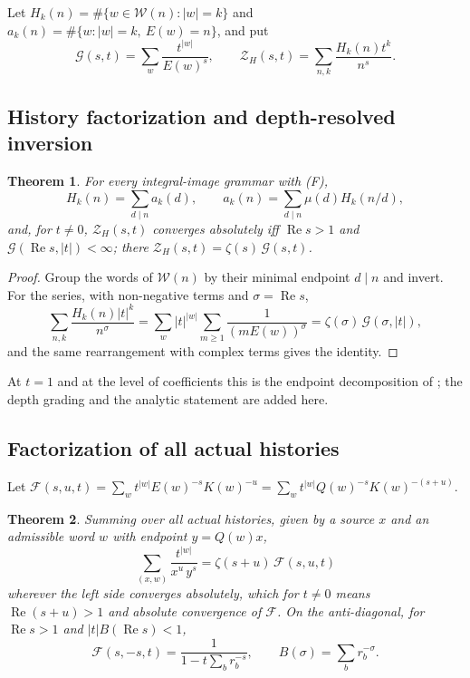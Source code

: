 \documentclass[11pt,a4paper]{article}
\newtheorem{theorem}{Theorem}[section]
\begin{document}
Let \(H_k(n)=\#\{w\in\mathcal W(n):|w|=k\}\) and
\(a_k(n)=\#\{w:|w|=k,\ E(w)=n\}\), and put
\[\mathcal G(s,t)=\sum_w\frac{t^{|w|}}{E(w)^s},\qquad \mathcal Z_H(s,t)=\sum_{n,k}\frac{H_k(n)t^k}{n^s}.\]

\subsection{History factorization and depth-resolved
inversion}

\begin{theorem}\label{thm:factor}
For every integral-image grammar with (F),
\[H_k(n)=\sum_{d\mid n}a_k(d),\qquad a_k(n)=\sum_{d\mid n}\mu(d)H_k(n/d),\]
and, for \(t\ne0\), \(\mathcal Z_H(s,t)\) converges absolutely iff
\(\operatorname{Re}s>1\) and
\(\mathcal G(\operatorname{Re}s,|t|)<\infty\); there
\(\mathcal Z_H(s,t)=\zeta(s)\,\mathcal G(s,t)\).

\end{theorem}

\begin{proof}

Group the words of \(\mathcal W(n)\) by their minimal endpoint
\(d\mid n\) and invert. For the series, with non-negative terms and
\(\sigma=\operatorname{Re}s\),
\[\sum_{n,k}\frac{H_k(n)|t|^k}{n^{\sigma}}=\sum_w|t|^{|w|}\sum_{m\ge1}\frac1{(mE(w))^{\sigma}}=\zeta(\sigma)\,\mathcal G(\sigma,|t|),\]
and the same rearrangement with complex terms gives the identity.

\end{proof}

At \(t=1\) and at the level of coefficients this is the endpoint
decomposition of \cite[Theorem~19.2]{monograph}; the depth grading and the
analytic statement are added here.

\subsection{Factorization of all actual
histories}

Let
\(\mathcal F(s,u,t)=\sum_w t^{|w|}E(w)^{-s}K(w)^{-u}=\sum_wt^{|w|}Q(w)^{-s}K(w)^{-(s+u)}\).

\begin{theorem}\label{thm:allhist}
Summing over all actual histories, given by a source \(x\) and an
admissible word \(w\) with endpoint \(y=Q(w)x\),
\[\sum_{(x,w)}\frac{t^{|w|}}{x^{u}\,y^{s}}=\zeta(s+u)\,\mathcal F(s,u,t)\]
wherever the left side converges absolutely, which for \(t\ne0\) means
\(\operatorname{Re}(s+u)>1\) and absolute convergence of \(\mathcal F\).
On the anti-diagonal, for \(\operatorname{Re}s>1\) and
\(|t|B(\operatorname{Re}s)<1\),
\[\mathcal F(s,-s,t)=\frac1{1-t\sum_b r_b^{-s}},\qquad B(\sigma)=\sum_br_b^{-\sigma}.\]

\end{theorem}
\end{document}
